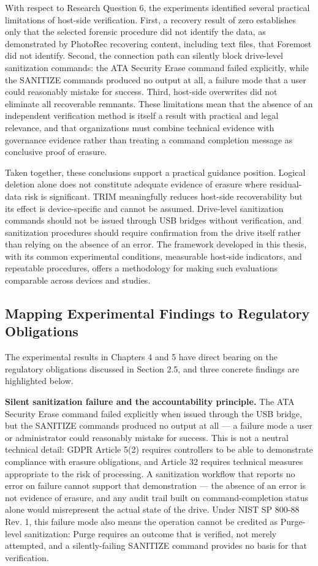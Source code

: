 With respect to Research Question 6, the experiments identified several practical limitations of host-side verification. First, a recovery result of zero establishes 
only that the selected forensic procedure did not identify the data, as demonstrated by PhotoRec recovering content, including text files, that Foremost did not identify. 
Second, the connection path can silently block drive-level sanitization commands: the ATA Security Erase command failed explicitly, while the SANITIZE commands produced 
no output at all, a failure mode that a user could reasonably mistake for success. Third, host-side overwrites did not eliminate all recoverable remnants. These 
limitations mean that the absence of an independent verification method is itself a result with practical and legal relevance, and that organizations must combine 
technical evidence with governance evidence rather than treating a command completion message as conclusive proof of erasure.

Taken together, these conclusions support a practical guidance position. Logical deletion alone does not constitute adequate evidence of erasure where residual-data risk 
is significant. TRIM meaningfully reduces host-side recoverability but its effect is device-specific and cannot be assumed. Drive-level sanitization commands should not 
be issued through USB bridges without verification, and sanitization procedures should require confirmation from the drive itself rather than relying on the absence of 
an error. The framework developed in this thesis, with its common experimental conditions, measurable host-side indicators, and repeatable procedures, offers a 
methodology for making such evaluations comparable across devices and studies.

\subsection{Mapping Experimental Findings to Regulatory Obligations}

The experimental results in Chapters 4 and 5 have direct bearing on the regulatory obligations discussed in Section 2.5, and three concrete findings are highlighted below.

\textbf{Silent sanitization failure and the accountability principle.} The ATA Security Erase command failed explicitly when issued through the USB bridge, but the 
SANITIZE commands produced no output at all — a failure mode a user or administrator could reasonably mistake for success. This is not a neutral technical detail: GDPR 
Article 5(2) requires controllers to be able to demonstrate compliance with erasure obligations, and Article 32 requires technical measures appropriate to the risk of 
processing. A sanitization workflow that reports no error on failure cannot support that demonstration — the absence of an error is not evidence of erasure, and any 
audit trail built on command-completion status alone would misrepresent the actual state of the drive. Under NIST SP 800-88 Rev. 1, this failure mode also means the 
operation cannot be credited as Purge-level sanitization: Purge requires an outcome that is verified, not merely attempted, and a silently-failing SANITIZE command 
provides no basis for that verification.

